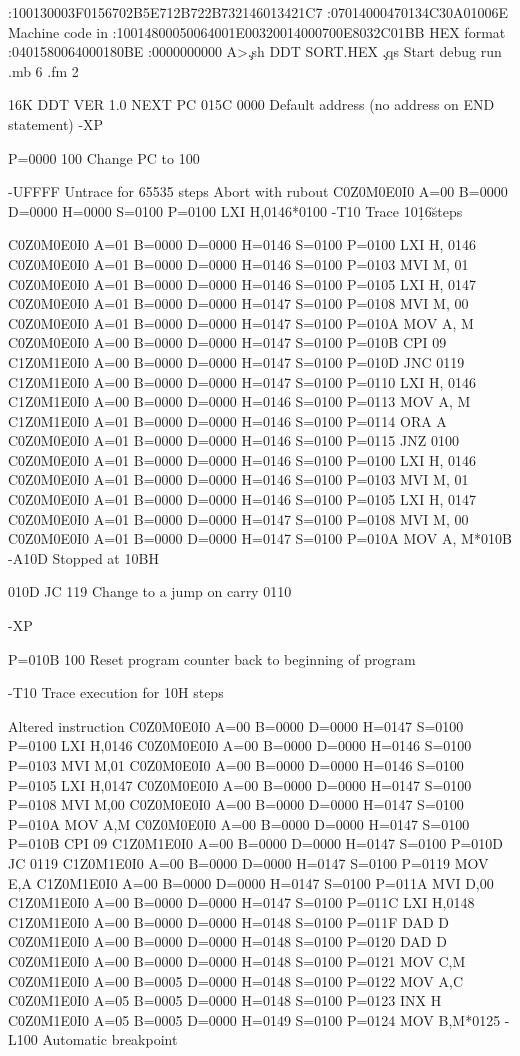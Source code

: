 :100130003F0156702B5E712B722B732146013421C7
:07014000470134C30A01006E                      Machine code in
:10014800050064001E00320014000700E8032C01BB    HEX format
:0401580064000180BE
:0000000000
A>\c
.sh
DDT SORT.HEX        \c
.qs
Start debug run
.mb 6
.fm 2

16K DDT VER 1.0
NEXT PC
015C 0000     Default address (no address on END statement)
-XP

P=0000 100    Change PC to 100

-UFFFF    Untrace for 65535 steps
                                           Abort with rubout
C0Z0M0E0I0 A=00 B=0000 D=0000 H=0000 S=0100 P=0100 LXI H,0146*0100
-T10    Trace 10\d16\u steps

C0Z0M0E0I0 A=01 B=0000 D=0000 H=0146 S=0100 P=0100 LXI H, 0146
C0Z0M0E0I0 A=01 B=0000 D=0000 H=0146 S=0100 P=0103 MVI M, 01
C0Z0M0E0I0 A=01 B=0000 D=0000 H=0146 S=0100 P=0105 LXI H, 0147
C0Z0M0E0I0 A=01 B=0000 D=0000 H=0147 S=0100 P=0108 MVI M, 00
C0Z0M0E0I0 A=01 B=0000 D=0000 H=0147 S=0100 P=010A MOV A, M
C0Z0M0E0I0 A=00 B=0000 D=0000 H=0147 S=0100 P=010B CPI 09
C1Z0M1E0I0 A=00 B=0000 D=0000 H=0147 S=0100 P=010D JNC 0119
C1Z0M1E0I0 A=00 B=0000 D=0000 H=0147 S=0100 P=0110 LXI H, 0146
C1Z0M1E0I0 A=00 B=0000 D=0000 H=0146 S=0100 P=0113 MOV A, M
C1Z0M1E0I0 A=01 B=0000 D=0000 H=0146 S=0100 P=0114 ORA A
C0Z0M0E0I0 A=01 B=0000 D=0000 H=0146 S=0100 P=0115 JNZ 0100
C0Z0M0E0I0 A=01 B=0000 D=0000 H=0146 S=0100 P=0100 LXI H, 0146
C0Z0M0E0I0 A=01 B=0000 D=0000 H=0146 S=0100 P=0103 MVI M, 01
C0Z0M0E0I0 A=01 B=0000 D=0000 H=0146 S=0100 P=0105 LXI H, 0147
C0Z0M0E0I0 A=01 B=0000 D=0000 H=0147 S=0100 P=0108 MVI M, 00
C0Z0M0E0I0 A=01 B=0000 D=0000 H=0147 S=0100 P=010A MOV A, M*010B
-A10D                                       Stopped at 10BH

010D JC 119   Change to a jump on carry
0110

-XP

P=010B 100   Reset program counter back to beginning of program

-T10    Trace execution for 10H steps

                                              Altered instruction
C0Z0M0E0I0 A=00 B=0000 D=0000 H=0147 S=0100 P=0100 LXI H,0146
C0Z0M0E0I0 A=00 B=0000 D=0000 H=0146 S=0100 P=0103 MVI M,01
C0Z0M0E0I0 A=00 B=0000 D=0000 H=0146 S=0100 P=0105 LXI H,0147
C0Z0M0E0I0 A=00 B=0000 D=0000 H=0147 S=0100 P=0108 MVI M,00
C0Z0M0E0I0 A=00 B=0000 D=0000 H=0147 S=0100 P=010A MOV A,M
C0Z0M0E0I0 A=00 B=0000 D=0000 H=0147 S=0100 P=010B CPI 09
C1Z0M1E0I0 A=00 B=0000 D=0000 H=0147 S=0100 P=010D JC 0119
C1Z0M1E0I0 A=00 B=0000 D=0000 H=0147 S=0100 P=0119 MOV E,A
C1Z0M1E0I0 A=00 B=0000 D=0000 H=0147 S=0100 P=011A MVI D,00
C1Z0M1E0I0 A=00 B=0000 D=0000 H=0147 S=0100 P=011C LXI H,0148
C1Z0M1E0I0 A=00 B=0000 D=0000 H=0148 S=0100 P=011F DAD D
C0Z0M1E0I0 A=00 B=0000 D=0000 H=0148 S=0100 P=0120 DAD D
C0Z0M1E0I0 A=00 B=0000 D=0000 H=0148 S=0100 P=0121 MOV C,M
C0Z0M1E0I0 A=00 B=0005 D=0000 H=0148 S=0100 P=0122 MOV A,C
C0Z0M1E0I0 A=05 B=0005 D=0000 H=0148 S=0100 P=0123 INX H
C0Z0M1E0I0 A=05 B=0005 D=0000 H=0149 S=0100 P=0124 MOV B,M*0125
-L100                               Automatic breakpoint

